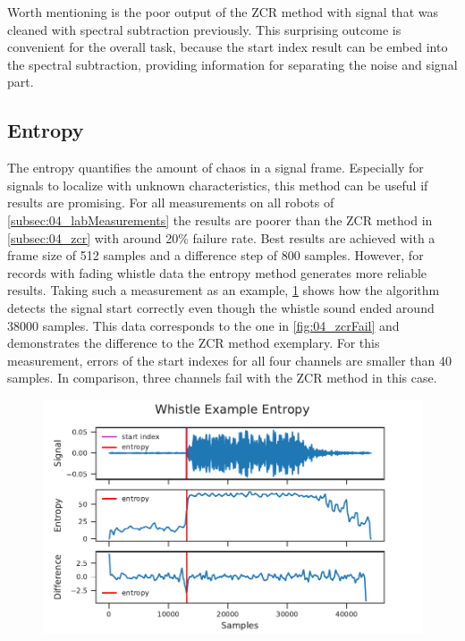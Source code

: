 Worth mentioning is the poor output of the \ac{ZCR} method with
signal that was cleaned with spectral subtraction previously.
This surprising outcome is convenient for the overall task,
because the start index result can be embed into the spectral
subtraction, providing information for separating the noise
and signal part.

\subsection{Entropy}
\label{subsec:04_entropy}

The entropy quantifies the amount of chaos in a signal frame.
Especially for signals to localize with unknown characteristics,
this method can be useful if results are promising.
For all measurements on all robots of \cref{subsec:04_labMeasurements}
the results are poorer than the \ac{ZCR} method in \cref{subsec:04_zcr}
with around 20\si{\percent} failure rate.
Best results are achieved with a frame size of 512 samples and a difference
step of 800 samples. 
However, for records with fading whistle data the entropy method
generates more reliable results.
Taking such a measurement as an example, \cref{fig:04_entropyGood}
shows how the algorithm detects the signal start correctly even though
the whistle sound ended around 38000 samples.
This data corresponds to the one in \cref{fig:04_zcrFail} and demonstrates
the difference to the \ac{ZCR} method exemplary.
For this measurement, errors of the start indexes for all four channels
are smaller than 40 samples.
In comparison, three channels fail with the \ac{ZCR} method in this case.
\begin{figure}[ht]
	\centering
	\includegraphics[]{figures/evaluation/entropy_good}
	\caption{}
	\label{fig:04_entropyGood}
\end{figure}

